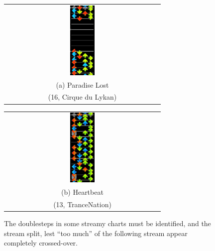 \documentclass[10pt]{sigplanconf}
\begin{document}
\begin{figure}[t]
	\begin{center}
	\begin{tabular}{c}
		\includegraphics[width=0.16\textwidth]{paradise-lost-false-positive.png}
		\\
		(a) Paradise Lost \\
		(16, Cirque du Lykan)
	\end{tabular}
	\begin{tabular}{c}
		\includegraphics[width=0.16\textwidth]{hearbeat-rollstream-doublestep.png}
		\\
		(b) Heartbeat \\
		(13, TranceNation)
	\end{tabular}
	\end{center}
	\caption{The doublesteps in some streamy charts must be identified, and the stream split, lest ``too much'' of the following stream appear completely crossed-over.}
	\label{fig:force-doublestep}
\end{figure}
\end{document}
